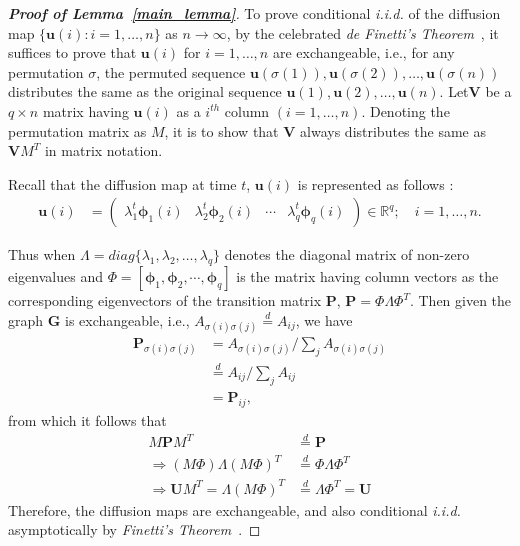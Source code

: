 \documentclass[11pt]{article}
\theoremstyle{definition}
\begin{document}
\begin{proof}[\textbf{Proof of Lemma~\ref{main_lemma}}]
To prove conditional \textit{i.i.d.} of the diffusion map $\{\mathbf{u}(i) : i=1,\ldots,n\}$ as $n \rightarrow \infty$, by the celebrated \textit{de Finetti's Theorem}~\cite{diaconis1980finite}, it suffices to prove that $\mathbf{u}(i)$ for $i=1,\ldots,n$ are exchangeable, i.e., for any permutation $\sigma$, the permuted sequence $\mathbf{u}(\sigma(1)), \mathbf{u}(\sigma(2)), \ldots,\mathbf{u}(\sigma(n))$ distributes the same as the original sequence $\mathbf{u}(1), \mathbf{u}(2), \ldots,\mathbf{u}(n)$. Let$\mathbf{V}$ be a $q \times n$ matrix having $\mathbf{u}(i)$ as a $i^{th}$ column $(i = 1, \ldots, n)$. Denoting the permutation matrix as $M$, it is to show that $\mathbf{V}$ always distributes the same as $\mathbf{V} M^{T}$ in matrix notation. 
	
Recall that the diffusion map at time $t$, $\mathbf{u}(i)$ is represented as follows :
\begin{align}
\mathbf{u}(i)  &= \begin{pmatrix} \lambda^{t}_{1} \mathbf{\phi}_{1}(i) & \lambda^{t}_{2} \mathbf{\phi}_{2} (i)  & \cdots & \lambda^{t}_{q} \mathbf{\phi}_{q}(i) \end{pmatrix} \in \mathbb{R}^{q}; \quad i = 1, \ldots, n.
\end{align}

Thus when $\Lambda=diag\{ \lambda_{1},\lambda_2,\ldots,\lambda_q \}$ denotes the diagonal matrix of non-zero eigenvalues and $\Phi =[ \mathbf{\phi}_1, \mathbf{\phi}_2,\cdots, \mathbf{\phi}_q ]$ is the matrix having column vectors as the corresponding eigenvectors of the transition matrix $\mathbf{P}$, $\mathbf{P}=\Phi \Lambda \Phi^{T}$. Then given the graph $\mathbf{G}$ is exchangeable, i.e., $A_{\sigma(i)\sigma(j)} \stackrel{d}{=} A_{ij}$, we have
\begin{align*}
\mathbf{P}_{\sigma(i) \sigma(j)} &= A_{\sigma(i) \sigma(j)} / \sum\limits_{j} A_{\sigma(i)\sigma(j)} \\
 &\stackrel{d}{=} A_{ij} /  \sum\limits_{j} A_{ij} \\
&= \mathbf{P}_{ij},
\end{align*}
 from which it follows that
\begin{align*}
	 M \mathbf{P} M^{T} &\stackrel{d}{=} \mathbf{P} \\
	  \Rightarrow (M \Phi) \Lambda (M \Phi)^{T} &\stackrel{d}{=} \Phi \Lambda \Phi^{T} \\
		\Rightarrow \mathbf{U} M^{T}= \Lambda (M \Phi)^{T} &\stackrel{d}{=} \Lambda \Phi^{T} = \mathbf{U}
\end{align*}	
Therefore, the diffusion maps are exchangeable, and also conditional \textit{i.i.d.} asymptotically by \textit{Finetti’s Theorem}~\cite{diaconis1980finite,orbanz2015bayesian}.
\end{proof}
\end{document}
